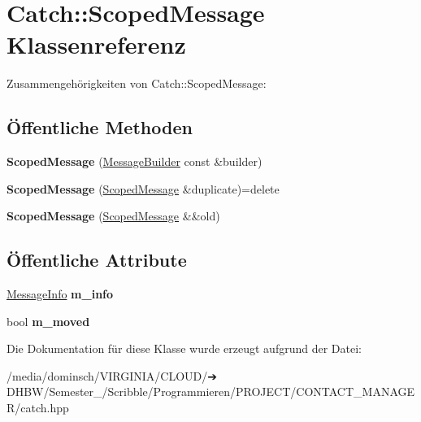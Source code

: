 \hypertarget{classCatch_1_1ScopedMessage}{}\section{Catch\+:\+:Scoped\+Message Klassenreferenz}
\label{classCatch_1_1ScopedMessage}


Zusammengehörigkeiten von Catch\+:\+:Scoped\+Message\+:
\subsection*{Öffentliche Methoden}
\begin{DoxyCompactItemize}
\item 
\mbox{\label{classCatch_1_1ScopedMessage_a5cc59f0f2ebe840e6607f83004d49a17}} 
{\bfseries Scoped\+Message} (\hyperlink{structCatch_1_1MessageBuilder}{Message\+Builder} const \&builder)
\item 
\mbox{\label{classCatch_1_1ScopedMessage_a5fe2e79afdfd737818c15edfc49f378e}} 
{\bfseries Scoped\+Message} (\hyperlink{classCatch_1_1ScopedMessage}{Scoped\+Message} \&duplicate)=delete
\item 
\mbox{\label{classCatch_1_1ScopedMessage_aac833a6a2245a26e6bd5c9252ca1caa0}} 
{\bfseries Scoped\+Message} (\hyperlink{classCatch_1_1ScopedMessage}{Scoped\+Message} \&\&old)
\end{DoxyCompactItemize}
\subsection*{Öffentliche Attribute}
\begin{DoxyCompactItemize}
\item 
\mbox{\label{classCatch_1_1ScopedMessage_ae6e1476f389cc6e1586f033b3747b27b}} 
\hyperlink{structCatch_1_1MessageInfo}{Message\+Info} {\bfseries m\+\_\+info}
\item 
\mbox{\label{classCatch_1_1ScopedMessage_a4fe5607c1f7407240a0da8405b1c12e7}} 
bool {\bfseries m\+\_\+moved}
\end{DoxyCompactItemize}


Die Dokumentation für diese Klasse wurde erzeugt aufgrund der Datei\+:\begin{DoxyCompactItemize}
\item 
/media/dominsch/\+V\+I\+R\+G\+I\+N\+I\+A/\+C\+L\+O\+U\+D/➔ D\+H\+B\+W/\+Semester\+\_/\+Scribble/\+Programmieren/\+P\+R\+O\+J\+E\+C\+T/\+C\+O\+N\+T\+A\+C\+T\+\_\+\+M\+A\+N\+A\+G\+E\+R/catch.\+hpp\end{DoxyCompactItemize}
